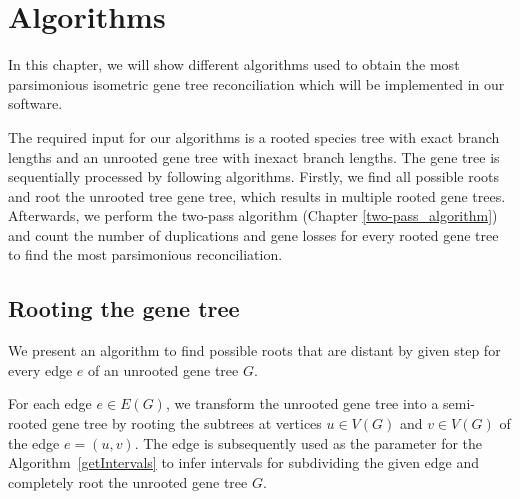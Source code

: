 \chapter{Algorithms}

In this chapter, we will show different algorithms used to obtain the most parsimonious isometric gene tree reconciliation which will be implemented in our software. 

The required input for our algorithms is a rooted species tree with exact branch lengths and an unrooted gene tree with inexact branch lengths. The gene tree is sequentially processed by following algorithms. Firstly, we find all possible roots and root the unrooted tree gene tree, which results in multiple rooted gene trees. Afterwards, we perform the two-pass algorithm (Chapter \ref{two-pass_algorithm}) and count the number of duplications and gene losses for every rooted gene tree to find the most parsimonious reconciliation.

\section{Rooting the gene tree}

We present an algorithm to find possible roots that are distant by given step for every edge $e$ of an unrooted gene tree $G$. 

For each edge $e \in E(G)$, we transform the unrooted gene tree into a semi-rooted gene tree by rooting the subtrees at vertices $u \in V(G)$ and $v \in V(G)$ of the edge $e = (u, v)$. The edge is subsequently used as the parameter for the Algorithm~\ref{getIntervals} to infer intervals for subdividing the given edge and completely root the unrooted gene tree $G$.

